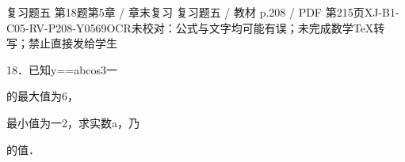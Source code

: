 \begin{bankitem}{复习题五 第18题}{第5章 / 章末复习 复习题五 / 教材 p.208 / PDF 第215页}{XJ-B1-C05-RV-P208-Y0569}{OCR未校对：公式与文字均可能有误；未完成数学TeX转写；禁止直接发给学生}
\begin{ocrdraft}
\par
18．已知y==abcos3一
\par
的最大值为6，
\par
最小值为一2，求实数a，乃
\par
的值．
\end{ocrdraft}
\end{bankitem}
